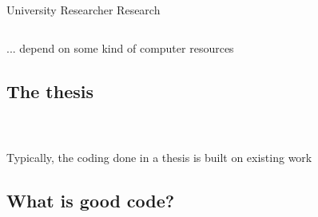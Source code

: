 \documentclass[usenames,dvipsnames]{beamer}
\theoremstyle{plain}
\theoremstyle{definition}
\begin{document}
\begin{frame}{\setframetitle{}}
  \vspace{-0.2cm}
  \begin{columns}[t]
    \centering
    University
    \centering
    Researcher
    \centering
    Research
  \end{columns}

  \vspace{2cm}

   \centering  ... depend on some kind of computer resources

\end{frame}





\subsection{The thesis}




\begin{frame}{\setframetitle{}}
    \begin{columns}
        \begin{figure}
         {}
       \end{figure}
     \end{columns}
    \centering Typically, the coding done in a thesis is built on existing work
\end{frame}


\subsection{What is good code?}
\end{document}
